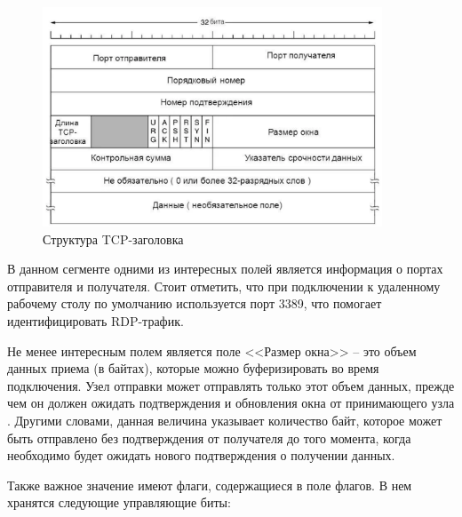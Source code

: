 \documentclass[spec, och, diploma]{SCWorks}
\begin{document}
  \begin{figure}[H]
    \centering
    \includegraphics[width=0.9\textwidth]{pics/tcp-segment.png}
    \caption{Структура TCP-заголовка}
    \label{tcp-header}
  \end{figure}

В данном сегменте одними из интересных полей является информация о портах отправителя и получателя. Стоит отметить, что при подключении к 
удаленному рабочему столу по умолчанию используется порт 3389, что помогает идентифицировать RDP-трафик.

Не менее интересным полем является поле <<Размер окна>> -- это объем данных приема (в байтах), которые можно буферизировать во время подключения. 
Узел отправки может отправлять только этот объем данных, прежде чем он должен ожидать подтверждения и обновления окна от принимающего узла \cite{winsize}.
Другими словами, данная величина указывает количество байт, которое может быть отправлено без подтверждения от получателя до того момента, когда 
необходимо будет ожидать нового подтверждения о получении данных.

Также важное значение имеют флаги, содержащиеся в поле флагов. В нем хранятся следующие управляющие биты:
\end{document}
